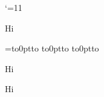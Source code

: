 \catcode`\@=11
\offinterlineskip

Hi

=\vbox to0pt{\hbox to\p@{}\vss}
\vbox to0pt{\hbox to\p@{}\vss}
\vbox to0pt{\hbox to\p@{}\vss}

Hi

Hi
